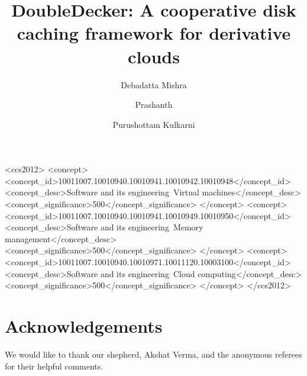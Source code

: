 \documentclass[sigplan]{acmart}
\begin{document}
\title{DoubleDecker: A cooperative disk caching framework for derivative clouds}
\author{Debadatta Mishra}


\author{Prashanth}

\author{Purushottam Kulkarni}




 \begin{CCSXML}
<ccs2012>
<concept>
<concept_id>10011007.10010940.10010941.10010942.10010948</concept_id>
<concept_desc>Software and its engineering~Virtual machines</concept_desc>
<concept_significance>500</concept_significance>
</concept>
<concept>
<concept_id>10011007.10010940.10010941.10010949.10010950</concept_id>
<concept_desc>Software and its engineering~Memory management</concept_desc>
<concept_significance>500</concept_significance>
</concept>
<concept>
<concept_id>10011007.10010940.10010971.10011120.10003100</concept_id>
<concept_desc>Software and its engineering~Cloud computing</concept_desc>
<concept_significance>500</concept_significance>
</concept>
</ccs2012>
\end{CCSXML}


\maketitle









\section*{Acknowledgements}
We would like to thank our shepherd, Akshat Verma,
and the anonymous referees for their helpful comments.
%


\end{document}
